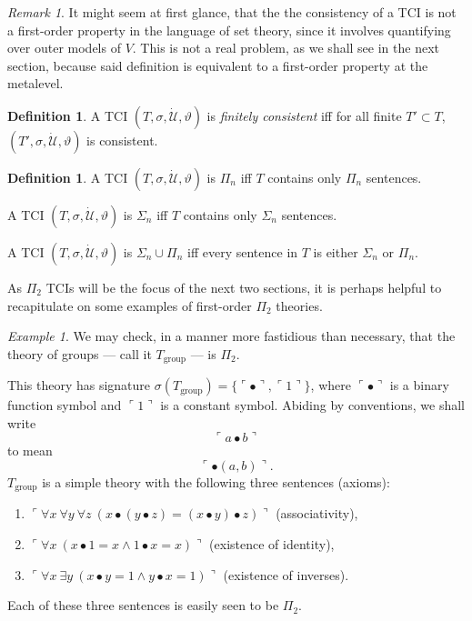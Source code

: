 \documentclass[12pt, twoside]{memoir}
\numberwithin{equation}{section}
\theoremstyle{definition}
\newtheorem{defi}[thm]{Definition}
\theoremstyle{remark}
\newtheorem{rem}[thm]{Remark}
\newtheorem{ex}[thm]{Example}
\theoremstyle{definition}
\theoremstyle{definition}
\theoremstyle{definition}
\theoremstyle{remark}
\begin{document}
\begin{rem}\label{promise}
It might seem at first glance, that the the consistency of a TCI is not a first-order property in the language of set theory, since it involves quantifying over outer models of $V$. This is not a real problem, as we shall see in the next section, because said definition is equivalent to a first-order property at the metalevel.
\end{rem}

\begin{defi}
A TCI $(T, \sigma, \dot{\mathcal{U}}, \vartheta)$ is \emph{finitely consistent} iff for all finite $T' \subset T$, $(T', \sigma, \dot{\mathcal{U}}, \vartheta)$ is consistent. 
\end{defi}

\begin{defi}
A TCI $(T, \sigma, \dot{\mathcal{U}}, \vartheta)$ is $\Pi_n$ iff $T$ contains only $\Pi_n$ sentences.

A TCI $(T, \sigma, \dot{\mathcal{U}}, \vartheta)$ is $\Sigma_n$ iff $T$ contains only $\Sigma_n$ sentences.

A TCI $(T, \sigma, \dot{\mathcal{U}}, \vartheta)$ is $\Sigma_n \cup \Pi_n$ iff every sentence in $T$ is either $\Sigma_n$ or $\Pi_n$.
\end{defi}

As $\Pi_2$ TCIs will be the focus of the next two sections, it is perhaps helpful to recapitulate on some examples of first-order $\Pi_2$ theories.

\begin{ex}
We may check, in a manner more fastidious than necessary, that the theory of groups --- call it $T_{\mathrm{group}}$ --- is $\Pi_2$.

This theory has signature $\sigma(T_{\mathrm{group}}) = \{\ulcorner \bullet \urcorner, \ulcorner 1 \urcorner\}$, where $\ulcorner \bullet \urcorner$ is a binary function symbol and $\ulcorner 1 \urcorner$ is a constant symbol. Abiding by conventions, we shall write $$\ulcorner a \bullet b \urcorner$$ to mean $$\ulcorner \bullet(a, b) \urcorner \text{.}$$ $T_{\mathrm{group}}$ is a simple theory with the following three sentences (axioms):
\begin{enumerate}[label=(\arabic*)]
    \item $\ulcorner \forall x \ \forall y \ \forall z \ (x \bullet (y \bullet z) = (x \bullet y) \bullet z) \urcorner$ (associativity),
    \item $\ulcorner \forall x \ (x \bullet 1 = x \wedge 1 \bullet x = x) \urcorner$ (existence of identity),
    \item $\ulcorner \forall x \ \exists y \ (x \bullet y = 1 \wedge y \bullet x = 1) \urcorner$ (existence of inverses).
\end{enumerate}
Each of these three sentences is easily seen to be $\Pi_2$.
\end{ex}
\end{document}

